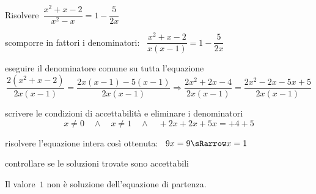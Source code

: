  \begin{esempio}
Risolvere~$\dfrac{x^{2}+x-2}{x^{2}-x}=1-\dfrac{5}{2x}$

\begin{enumerate*}
\item scomporre in fattori i denominatori:~
\(\dfrac{x^{2}+x-2}{x(x-1)}=1-\dfrac{5}{2x}\)

\item eseguire il denominatore comune su tutta l'equazione
\[\frac{2(x^{2}+x-2)}{2x(x-1)}=\frac{2x(x-1)-5(x-1)}{2x(x-1)}\Rightarrow
\frac{2x^{2}+2x-4}{2x(x-1)}=\frac{2x^2-2x-5x+5}{2x(x-1)}\]

\item scrivere le condizioni di accettabilità e eliminare i denominatori
\[x \neq 0 \quad \wedge \quad x \neq 1 \quad \wedge \quad 
  +2x +2x +5x = +4 +5\]

\item risolvere l'equazione intera così ottenuta:~
\(9x = 9 \sRarrow x=1\)

\item controllare se le soluzioni trovate sono accettabili

\centering Il valore~$1$ non è soluzione dell'equazione di partenza.

\end{enumerate*}

 \end{esempio}
 
